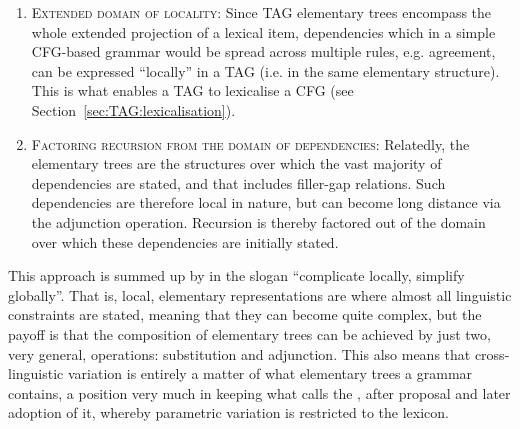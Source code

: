 \documentclass[output=paper,hidelinks]{langscibook}
\begin{document}
\begin{enumerate}
  \item \textsc{Extended domain of locality}: Since TAG elementary trees
        encompass the whole extended projection of a lexical item, dependencies
        which in a simple CFG-based grammar would be spread across multiple
        rules, e.g. agreement, can be expressed ``locally'' in a TAG (i.e. in
        the same elementary structure). This is what enables a TAG to lexicalise
        a CFG (see Section~\ref{sec:TAG:lexicalisation}).
  \item \textsc{Factoring recursion from the domain of dependencies}: Relatedly,
        the elementary trees are the structures over which the vast majority of
        dependencies are stated, and that includes filler-gap relations. Such
        dependencies are therefore local in nature, but can become long distance
        via the adjunction operation. Recursion is thereby factored out of the
        domain over which these dependencies are initially stated.
\end{enumerate}
%
This approach is summed up by \citet[2]{bangalore:introduction} in the slogan
``complicate locally, simplify globally''. That is, local, elementary
representations are where almost all linguistic constraints are stated, meaning
that they can become quite complex, but the payoff is that the composition of
elementary trees can be achieved by just two, very general, operations:
substitution and adjunction. This also means that cross-linguistic variation is
entirely a matter of what elementary trees a grammar contains, a position very
much in keeping what \citet[353]{baker2008macroparameter} calls the
, after  proposal and
 later adoption of it, whereby parametric
variation is restricted to the lexicon.
\end{document}
